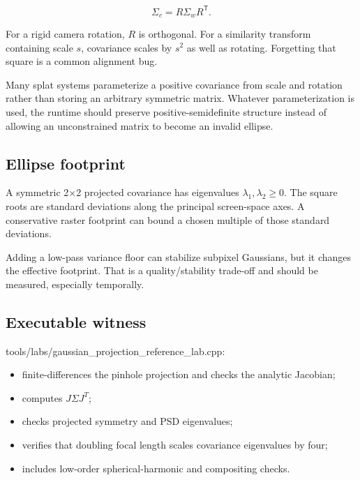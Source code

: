 \[
\Sigma_c=R\Sigma_wR^{\mathsf T}.
\]

For a rigid camera rotation, \(R\) is orthogonal. For a similarity transform containing scale \(s\), covariance scales by \(s^2\) as well as rotating. Forgetting that square is a common alignment bug.

Many splat systems parameterize a positive covariance from scale and rotation rather than storing an arbitrary symmetric matrix. Whatever parameterization is used, the runtime should preserve positive-semidefinite structure instead of allowing an unconstrained matrix to become an invalid ellipse.

\subsection{Ellipse footprint}\label{appendix-24269cb6977c-ellipse-footprint}

\hypertarget{appendix-24269cb6977c-ellipse-footprint}{}

A symmetric 2×2 projected covariance has eigenvalues \(\lambda_1,\lambda_2\ge0\). The square roots are standard deviations along the principal screen-space axes. A conservative raster footprint can bound a chosen multiple of those standard deviations.

Adding a low-pass variance floor can stabilize subpixel Gaussians, but it changes the effective footprint. That is a quality/stability trade-off and should be measured, especially temporally.

\subsection{Executable witness}\label{appendix-24269cb6977c-executable-witness}

\hypertarget{appendix-24269cb6977c-executable-witness}{}

tools/labs/gaussian\_projection\_reference\_lab.cpp:

\begin{itemize}
\tightlist
\item
  finite-differences the pinhole projection and checks the analytic Jacobian;
\item
  computes \(J\Sigma J^T\);
\item
  checks projected symmetry and PSD eigenvalues;
\item
  verifies that doubling focal length scales covariance eigenvalues by four;
\item
  includes low-order spherical-harmonic and compositing checks.
\end{itemize}

